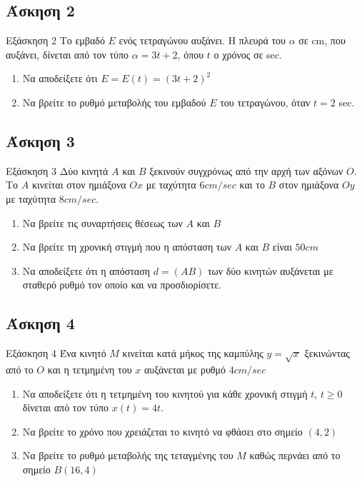 \documentclass[greek]{beamer}
\begin{document}
\subsection{Άσκηση 2}
\begin{frame}[label=Άσκηση2]{Εξάσκηση 2}
  Το εμβαδό $Ε$ ενός τετραγώνου αυξάνει. Η πλευρά του $α$ σε cm, που αυξάνει, δίνεται από τον τύπο $α=3t+2$, όπου $t$ ο χρόνος σε sec.
  \begin{enumerate}
    \item<1-> Να αποδείξετε ότι $Ε=Ε(t)=(3t+2)^2$
    \item<2-> Να βρείτε το ρυθμό μεταβολής του εμβαδού $Ε$ του τετραγώνου, όταν $t=2$ sec.
  \end{enumerate}

\end{frame}

\subsection{Άσκηση 3}
\begin{frame}[label=Άσκηση3]{Εξάσκηση 3}
  Δύο κινητά $Α$ και $Β$ ξεκινούν συγχρόνως από την αρχή των αξόνων $Ο$. Το $Α$ κινείται στον ημιάξονα $Οx$ με ταχύτητα $6cm/sec$ και το $Β$ στον ημιάξονα $Οy$ με ταχύτητα $8cm/sec$.
  \begin{enumerate}
    \item<1-> Να βρείτε τις συναρτήσεις θέσεως των $Α$ και $Β$
    \item<2-> Να βρείτε τη χρονική στιγμή που η απόσταση των $Α$ και $Β$ είναι $50cm$
    \item<3-> Να αποδείξετε ότι η απόσταση $d=(ΑΒ)$ των δύο κινητών αυξάνεται με σταθερό ρυθμό τον οποίο και να προσδιορίσετε.
  \end{enumerate}

\end{frame}

\subsection{Άσκηση 4}
\begin{frame}[label=Άσκηση4]{Εξάσκηση 4}
  Ένα κινητό $Μ$ κινείται κατά μήκος της καμπύλης $y=\sqrt{x}$ ξεκινώντας από το $Ο$ και η τετμημένη του $x$ αυξάνεται με ρυθμό $4cm/sec$
  \begin{enumerate}
    \item<1-> Να αποδείξετε ότι η τετμημένη του κινητού για κάθε χρονική στιγμή $t$, $t\ge 0$ δίνεται από τον τύπο $x(t)=4t$.
    \item<2-> Να βρείτε το χρόνο που χρειάζεται το κινητό να φθάσει στο σημείο $(4,2)$
    \item<3-> Να βρείτε το ρυθμό μεταβολής της τεταγμένης του $Μ$ καθώς περνάει από το σημείο $Β(16,4)$
  \end{enumerate}

\end{frame}
\end{document}
